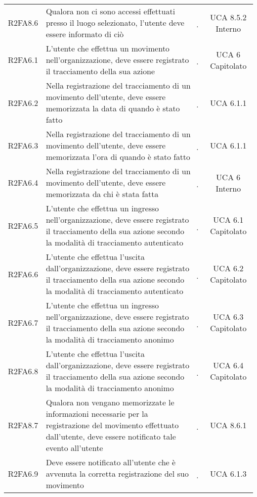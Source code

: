 {\begin{longtable}{ c C{8cm} c c}
R2FA8.6 & Qualora non ci sono accessi effettuati presso il luogo selezionato, l'utente deve essere informato di ciò & \d & UCA 8.5.2 Interno \\

R2FA6.1 & L’utente che effettua un movimento nell’organizzazione, deve essere registrato il tracciamento della sua azione & \d & UCA 6 Capitolato \\

R2FA6.2 & Nella registrazione del tracciamento di un movimento dell’utente, deve essere memorizzata la data di quando è stato fatto & \d & UCA 6.1.1 \\

R2FA6.3 & Nella registrazione del tracciamento di un movimento dell’utente, deve essere memorizzata l’ora di quando è stato fatto & \d & UCA 6.1.1 \\

R2FA6.4 & Nella registrazione del tracciamento di un movimento dell’utente, deve essere memorizzata da chi è stata fatta & \d & UCA 6 Interno \\

R2FA6.5 & L’utente che effettua un ingresso nell’organizzazione, deve essere registrato il tracciamento della sua azione secondo la modalità di tracciamento autenticato & \d & UCA 6.1 Capitolato \\

R2FA6.6 & L’utente che effettua l’uscita dall’organizzazione, deve essere registrato il tracciamento della sua azione secondo la modalità di tracciamento autenticato & \d & UCA 6.2 Capitolato \\

R2FA6.7 & L’utente che effettua un ingresso nell’organizzazione, deve essere registrato il tracciamento della sua azione secondo la modalità di tracciamento anonimo & \d & UCA 6.3 Capitolato \\

R2FA6.8 & L’utente che effettua l’uscita dall’organizzazione, deve essere registrato il tracciamento della sua azione secondo la modalità di tracciamento anonimo & \d & UCA 6.4 Capitolato \\

R2FA8.7 & Qualora non vengano memorizzate le informazioni necessarie per la registrazione del movimento effettuato dall’utente, deve essere notificato tale evento all’utente & \d & UCA 8.6.1 \\

R2FA6.9 & Deve essere notificato all’utente che è avvenuta la corretta registrazione del suo movimento & \d & UCA 6.1.3 \\


\end{longtable}}
